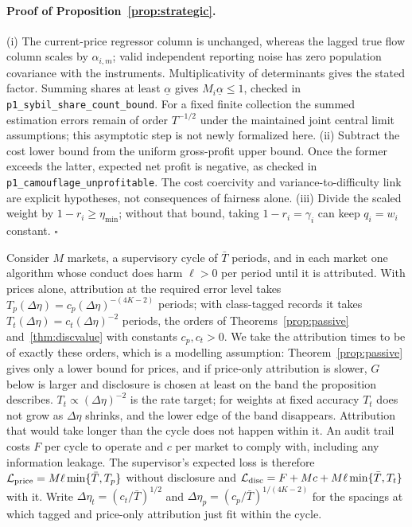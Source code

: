 \documentclass[12pt]{article}
\theoremstyle{definition}
\theoremstyle{remark}
\begin{document}
\paragraph{Proof of Proposition~\ref{prop:strategic}.}
 (i) The current-price regressor column is unchanged, whereas the lagged true flow column scales by $\alpha_{i,m}$; valid independent reporting noise has zero population covariance with the instruments. Multiplicativity of determinants gives the stated factor. Summing shares at least $\underline\alpha$ gives $M_i\underline\alpha\le1$, checked in \nolinkurl{p1_sybil_share_count_bound}. For a fixed finite collection the summed estimation errors remain of order $T^{-1/2}$ under the maintained joint central limit assumptions; this asymptotic step is not newly formalized here. (ii) Subtract the cost lower bound from the uniform gross-profit upper bound. Once the former exceeds the latter, expected net profit is negative, as checked in \nolinkurl{p1_camouflage_unprofitable}. The cost coercivity and variance-to-difficulty link are explicit hypotheses, not consequences of fairness alone. (iii) Divide the scaled weight by $1-r_i\ge\eta_{\min}$; without that bound, taking $1-r_i=\gamma_i$ can keep $q_i=w_i$ constant. $\square$


Consider $M$ markets, a supervisory cycle of $\bar T$ periods, and in each market one algorithm whose conduct does harm $\ell>0$ per period until it is attributed. With prices alone, attribution at the required error level takes $T_p(\Delta\eta)=c_p(\Delta\eta)^{-(4K-2)}$ periods; with class-tagged records it takes $T_t(\Delta\eta)=c_t(\Delta\eta)^{-2}$ periods, the orders of Theorems~\ref{prop:passive} and~\ref{thm:discvalue} with constants $c_p,c_t>0$. We take the attribution times to be of exactly these orders, which is a modelling assumption: Theorem~\ref{prop:passive} gives only a lower bound for prices, and if price-only attribution is slower, $G$ below is larger and disclosure is chosen at least on the band the proposition describes. $T_t\propto(\Delta\eta)^{-2}$ is the rate target; for weights at fixed accuracy $T_t$ does not grow as $\Delta\eta$ shrinks, and the lower edge of the band disappears. Attribution that would take longer than the cycle does not happen within it. An audit trail costs $F$ per cycle to operate and $c$ per market to comply with, including any information leakage. The supervisor's expected loss is therefore $\mathcal L_{\rm price}=M\ell\min\{\bar T,T_p\}$ without disclosure and $\mathcal L_{\rm disc}=F+Mc+M\ell\min\{\bar T,T_t\}$ with it. Write $\Delta\eta_t=(c_t/\bar T)^{1/2}$ and $\Delta\eta_p=(c_p/\bar T)^{1/(4K-2)}$ for the spacings at which tagged and price-only attribution just fit within the cycle.
\end{document}
